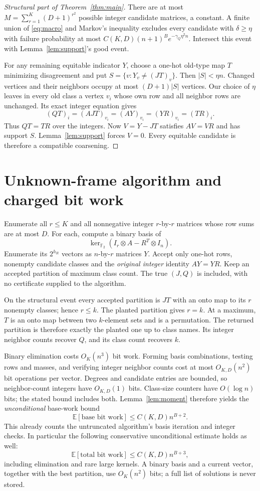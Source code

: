 \documentclass[11pt]{article}
\newcommand{\F}{\mathbb F_2}
\newcommand{\E}{\mathbb E}
\begin{document}
\begin{proof}[Structural part of Theorem~\ref{thm:main}]
There are at most
$M=\sum_{r=1}^K(D+1)^{r^2}$ possible integer candidate matrices,
a constant. A finite union of \eqref{eq:macro} and Markov's inequality
excludes every candidate with $\delta\ge\eta$ with failure probability
at most $C(K,D)(n+1)^B e^{-\gamma_Q\eta^2n}$.
Intersect this event with Lemma~\ref{lem:support}'s good event.

For any remaining equitable indicator $Y$, choose a one-hot old-type
map $T$ minimizing disagreement and put
$S=\{v:Y_v\ne(JT)_v\}$. Then $|S|<\eta n$.
Changed vertices and their neighbors occupy at most $(D+1)|S|$ vertices.
Our choice of $\eta$ leaves in every old class a vertex $v_i$ whose
own row and all neighbor rows are unchanged. Its exact integer equation
gives
\[
 (QT)_i=(AJT)_{v_i}=(AY)_{v_i}=(YR)_{v_i}=(TR)_i.
\]
Thus $QT=TR$ over the integers. Now $V=Y-JT$ satisfies $AV=VR$ and
has support $S$. Lemma~\ref{lem:support} forces $V=0$.
Every equitable candidate is therefore a compatible coarsening.
\end{proof}

\section{Unknown-frame algorithm and charged bit work}\label{sec:algorithm}
Enumerate all $r\le K$ and all nonnegative integer $r$-by-$r$ matrices
whose row sums are at most $D$. For each, compute a binary basis of
\[
 \ker_{\F}(I_r\otimes A-R^T\otimes I_n).
\]
Enumerate its $2^{h_R}$ vectors as $n$-by-$r$ matrices $Y$. Accept only
one-hot rows, nonempty candidate classes and the \emph{original integer}
identity $AY=YR$. Keep an accepted partition of maximum class count.
The true $(J,Q)$ is included, with no certificate supplied to the
algorithm.

On the structural event every accepted partition is $JT$ with an onto
map to its $r$ nonempty classes; hence $r\le k$. The planted partition
gives $r=k$. At a maximum, $T$ is an onto map between two $k$-element
sets and is a permutation. The returned partition is therefore exactly
the planted one up to class names. Its integer neighbor counts recover
$Q$, and its class count recovers $k$.

Binary elimination costs $O_K(n^3)$ bit work. Forming basis combinations,
testing rows and masses, and verifying integer neighbor counts cost at
most $O_{K,D}(n^2)$ bit operations per vector. Degrees and candidate
entries are bounded, so neighbor-count integers have $O_{K,D}(1)$ bits.
Class-size counters have $O(\log n)$ bits; the stated bound includes both.
Lemma~\ref{lem:moment} therefore yields the \emph{unconditional} base-work bound
\[
 \E[\text{base bit work}]\le C(K,D)n^{B+2}.
\]
This already counts the untruncated algorithm's basis iteration and
integer checks. In particular the following conservative unconditional
estimate holds as well:
\[
 \E[\text{total bit work}]\le C(K,D)n^{B+3},
\]
including elimination and rare large kernels.
A binary basis and a current vector, together with the best partition,
use $O_K(n^2)$ bits; a full list of solutions is never stored.
\end{document}

